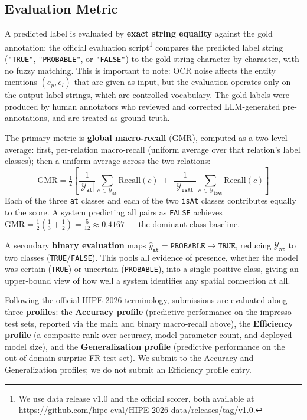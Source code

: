 \documentclass[
]{ceurart}
\theoremstyle{definition}
\begin{document}
\subsection{Evaluation Metric}

A predicted label is evaluated by \textbf{exact string equality} against the gold annotation: the official evaluation script\footnote{We use data release v1.0 and the official scorer, both available at \url{https://github.com/hipe-eval/HIPE-2026-data/releases/tag/v1.0}.} compares the predicted label string (\texttt{"TRUE"}, \texttt{"PROBABLE"}, or \texttt{"FALSE"}) to the gold string character-by-character, with no fuzzy matching.
This is important to note: OCR noise affects the entity mentions $(e_p, e_l)$ that are given as input, but the evaluation operates only on the output label strings, which are controlled vocabulary.
The gold labels were produced by human annotators who reviewed and corrected LLM-generated pre-annotations, and are treated as ground truth.

The primary metric is \textbf{global macro-recall} (GMR), computed as a two-level average: first, per-relation macro-recall (uniform average over that relation's label classes); then a uniform average across the two relations:
\begin{equation}\label{eq:gmr}
  \mathrm{GMR}
  = \tfrac{1}{2}\!\left[
    \frac{1}{|\mathcal{Y}_{\texttt{at}}|}\sum_{c\,\in\,\mathcal{Y}_{\texttt{at}}}\!\mathrm{Recall}(c)
    \;+\;
    \frac{1}{|\mathcal{Y}_{\texttt{isAt}}|}\sum_{c\,\in\,\mathcal{Y}_{\texttt{isAt}}}\!\mathrm{Recall}(c)
  \right]
\end{equation}
Each of the three \texttt{at} classes and each of the two \texttt{isAt} classes contributes equally to the score.
A system predicting all pairs as \texttt{FALSE} achieves $\mathrm{GMR} = \tfrac{1}{2}\!\left(\tfrac{1}{3} + \tfrac{1}{2}\right) = \tfrac{5}{12} \approx \mathbf{0.4167}$ --- the dominant-class baseline.

A secondary \textbf{binary evaluation} maps $\hat{y}_{\texttt{at}} = \texttt{PROBABLE} \to \texttt{TRUE}$, reducing $\mathcal{Y}_{\texttt{at}}$ to two classes (\texttt{TRUE}/\texttt{FALSE}).
This pools all evidence of presence, whether the model was certain (\texttt{TRUE}) or uncertain (\texttt{PROBABLE}), into a single positive class, giving an upper-bound view of how well a system identifies any spatial connection at all.

Following the official HIPE 2026 terminology, submissions are evaluated along three \textbf{profiles}: the \textbf{Accuracy profile} (predictive performance on the impresso test sets, reported via the main and binary macro-recall above), the \textbf{Efficiency profile} (a composite rank over accuracy, model parameter count, and deployed model size), and the \textbf{Generalization profile} (predictive performance on the out-of-domain surprise-FR test set). We submit to the Accuracy and Generalization profiles; we do not submit an Efficiency profile entry.
\end{document}

